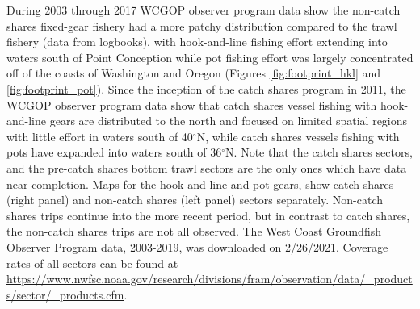 \documentclass[11pt,
  english,
  a4paper,
]{article}
\begin{document}
\leavevmode\tagmcend\tagstructend\par

During 2003 through 2017 WCGOP observer program data show the non-catch shares fixed-gear fishery had a more patchy distribution compared to the trawl fishery (data from logbooks), with hook-and-line fishing effort extending into waters south of Point Conception while pot fishing effort was largely concentrated off of the coasts of Washington and Oregon (Figures \ref{fig:footprint_hkl} and \ref{fig:footprint_pot}). Since the inception of the catch shares program in 2011, the WCGOP observer program data show that catch shares vessel fishing with hook-and-line gears are distributed to the north and focused on limited spatial regions with little effort in waters south of 40{\(^{\circ}\)\leavevmode\tagmcend\tagstructend}N, while catch shares vessels fishing with pots have expanded into waters south of 36{\(^{\circ}\)\leavevmode\tagmcend\tagstructend}N. Note that the catch shares sectors, and the pre-catch shares bottom trawl sectors are the only ones which have data near completion. Maps for the hook-and-line and pot gears, show catch shares (right panel) and non-catch shares (left panel) sectors separately. Non-catch shares trips continue into the more recent period, but in contrast to catch shares, the non-catch shares trips are not all observed. The West Coast Groundfish Observer Program data, 2003-2019, was downloaded on 2/26/2021. Coverage rates of all sectors can be found at {\url{https://www.nwfsc.noaa.gov/research/divisions/fram/observation/data/_products/sector/_products.cfm}\leavevmode\tagmcend\tagstructend}.

\end{document}
